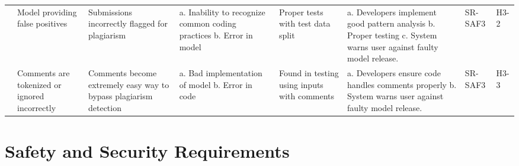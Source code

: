\documentclass{article}
\begin{document}
\begin{landscape}
\begin{table}[ht]
{\begin{tabular}{|p{1.75cm}|p{4cm}|p{5cm}|p{5cm}|p{3cm}|p{5cm}|p{2cm}|p{2cm}|}
        & Model providing false positives & Submissions incorrectly flagged for plagiarism & a. Inability to recognize common coding practices \newline b. Error in model & Proper tests with test data split & a. Developers implement good pattern analysis \newline b. Proper testing \newline c. System warns user against faulty model release. & SR-SAF3 & H3-2\\
        \cline{2-8}
        & Comments are tokenized or ignored incorrectly & Comments become extremely easy way to bypass plagiarism detection & a. Bad implementation of model \newline b. Error in code & Found in testing using inputs with comments & a. Developers ensure code handles comments properly \newline b. System warns user against faulty model release. & SR-SAF3 & H3-3\\
        \hline
        \end{tabular}
        } %
        \label{table:fmea}
    \end{table}
\end{landscape}
   

\section{Safety and Security Requirements}
\end{document}
